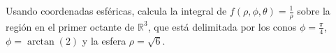 Usando coordenadas esféricas, calcula la integral de \( f(\rho, \phi, \theta) = \frac{1}{\rho} \) sobre la región en el primer octante de \( \mathbb{R}^3 \), que está delimitada por los conos \( \phi = \frac{\pi}{4} \), \( \phi = \arctan(2) \) y la esfera \( \rho = \sqrt{6} \).
